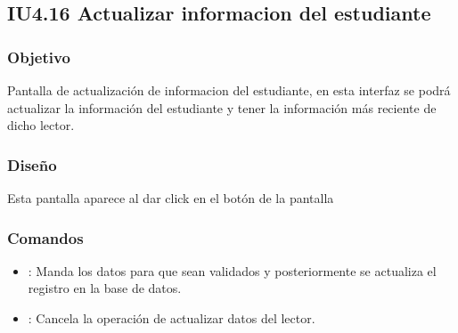 \newpage
\subsection{IU4.16 Actualizar informacion del estudiante}

\subsubsection{Objetivo}
	Pantalla de actualización de informacion del estudiante, en esta interfaz se podrá actualizar la información del estudiante y tener la información más reciente de dicho lector.

\subsubsection{Diseño}
	Esta pantalla aparece al dar click en el botón  de la pantalla  


\subsubsection{Comandos}
	\begin{itemize}
		\item {}: Manda los datos para que sean validados y posteriormente se actualiza el registro en la base de datos.
		\item {}: Cancela la operación de actualizar datos del lector.
	\end{itemize}	


